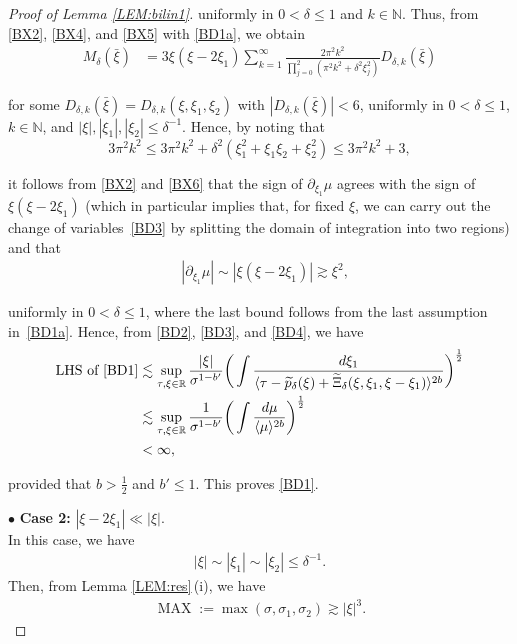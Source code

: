 \documentclass[letterpaper, 11pt,  reqno]{amsart}
\DeclareMathOperator{\MAX}{MAX}
\newcommand{\1}{\hspace{0.5mm}\textup{I}\hspace{0.5mm}}
\newcommand{\noi}{\noindent}
\newcommand{\R}{\mathbb{R}}
\newcommand{\bul}{\bullet}
\newcommand{\dl}{\delta}
\newcommand{\s}{\sigma}
\newcommand{\wt}{\widetilde}
\newcommand{\dd}{\partial}
\newcommand{\les}{\lesssim}
\newcommand{\ges}{\gtrsim}
\newcommand{\jb}[1]
{\langle #1 \rangle}
\newcommand{\N}{\mathbb{N}}
\numberwithin{equation}{section}
\numberwithin{theorem}{section}
\begin{document}
\begin{proof}[Proof of Lemma \ref{LEM:bilin1}]
\noi
uniformly in $0 < \dl \le 1$ and $k \in \N$.
Thus, from \eqref{BX2}, \eqref{BX4}, and
\eqref{BX5}  with \eqref{BD1a}, 
we obtain
\begin{align}
M_{\dl}(\bar \xi) & = 3\xi  (\xi -2 \xi_1)
 \sum_{k=1}^{\infty}   
 \frac{2 \pi^2 k^2 }
 {\prod_{j = 0}^2(\pi^2 k^2 +\dl^2\xi_j^2)}
  D_{\dl, k}(\bar \xi)
\label{BX6}
\end{align}

\noi
for  some $D_{\dl, k}(\bar \xi) =  D_{\dl, k}(\xi, \xi_1, \xi_2)$
with $| D_{\dl, k}(\bar \xi)| <  6$, 
uniformly in 
 $0 < \dl \le 1$, $k \in \N$, 
and  $ |\xi|, 
 |\xi_1|, |\xi_2|\le   \dl^{-1}$.
Hence, by noting that 
\[
3\pi^2 k^2 \le 
3 \pi^2 k^2 + \dl^2(\xi_1^2 + \xi_1 \xi_2 + \xi_2^2)
\le 3\pi^2 k^2  + 3, 
\]

\noi
it follows from \eqref{BX2} and \eqref{BX6} that 
 the sign of $\dd_{\xi_1} \mu$
agrees with the sign of $\xi(\xi - 2\xi_1)$
(which in particular implies that,  for fixed $\xi$, we can carry out the change of variables~\eqref{BD3}
by splitting the domain of integration into two regions)
and that 
\begin{align}
& |\dd_{\xi_1} \mu |
\sim |\xi (\xi - 2\xi_1)| \ges \xi^2, 
\label{BD4}
\end{align}

\noi
uniformly in $0 < \dl \le 1$, 
 where the last bound follows from the last assumption in~\eqref{BD1a}.
Hence, from \eqref{BD2}, \eqref{BD3},  and \eqref{BD4}, we have
\begin{align*}
\text{LHS of \eqref{BD1}}
& \les \sup_{\tau, \xi \in \R} \frac{|\xi|}{\s^{1-b'}}
\bigg( \int \frac{d\xi_1}{\jb{\tau  - \wt p_\dl(\xi) + \wt \Xi_\dl(\xi, \xi_1, \xi- \xi_1)}^{2b}}\bigg)^\frac{1}{2}\\
& \les \sup_{\tau, \xi \in \R} \frac{1}{\s^{1-b'}}
\bigg( \int \frac{d\mu}{\jb{\mu}^{2b}}\bigg)^\frac{1}{2}\\
& < \infty, 
\end{align*}

\noi
provided that $b > \frac 12$ and $b' \le 1$.
This proves \eqref{BD1}.








\medskip



\noi
$\bul$ {\bf Case 2:}
$|\xi - 2\xi_1|\ll |\xi|$.
\\
\indent
In this case, we have 
\begin{align}
 |\xi|\sim |\xi_1| \sim |\xi_2| \le  \dl^{-1} .
\label{bilin1aa}
\end{align}
Then, from Lemma \ref{LEM:res}\,(i), 
we have 
\begin{align}
\MAX := \max(\s, \s_1, \s_2) \ges | \xi|^3.
\label{bilin1a}
\end{align}




\end{proof}
\end{document}
